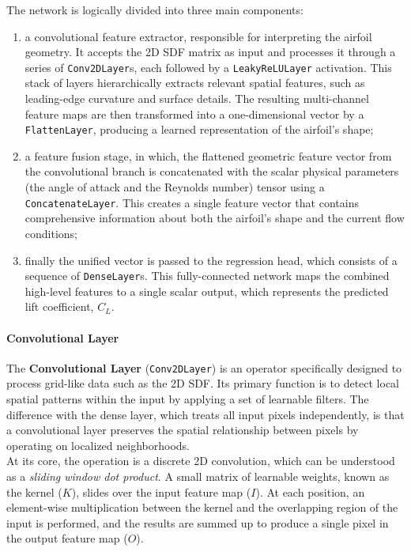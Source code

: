 The network is logically divided into three main components:\\ 
\begin{enumerate}[itemsep=2ex]
    \item a convolutional feature extractor, responsible for interpreting the airfoil geometry. It accepts the 2D SDF matrix as input and processes it through a series of \texttt{Conv2DLayer}s, each followed by a \texttt{LeakyReLULayer} activation. This stack of layers hierarchically extracts relevant spatial features, such as leading-edge curvature and surface details. The resulting multi-channel feature maps are then transformed into a one-dimensional vector by a \texttt{FlattenLayer}, producing a learned representation of the airfoil's shape;
    \item a feature fusion stage, in which, the flattened geometric feature vector from the convolutional branch is concatenated with the scalar physical parameters (the angle of attack and the Reynolds number) tensor using a \texttt{ConcatenateLayer}. This creates a single feature vector that contains comprehensive information about both the airfoil's shape and the current flow conditions;
    \item finally the unified vector is passed to the regression head, which consists of a sequence of \texttt{DenseLayer}s. This fully-connected network maps the combined high-level features to a single scalar output, which represents the predicted lift coefficient, $C_L$.
\end{enumerate}

\paragraph{Convolutional Layer}

The \textbf{Convolutional Layer} (\texttt{Conv2DLayer}) is an operator specifically designed to process grid-like data such as the 2D SDF. Its primary function is to detect local spatial patterns within the input by applying a set of learnable filters. The difference with the dense layer, which treats all input pixels independently, is that a convolutional layer preserves the spatial relationship between pixels by operating on localized neighborhoods.\\

At its core, the operation is a discrete 2D convolution, which can be understood as a \textit{sliding window dot product}. A small matrix of learnable weights, known as the kernel ($K$), slides over the input feature map ($I$). At each position, an element-wise multiplication between the kernel and the overlapping region of the input is performed, and the results are summed up to produce a single pixel in the output feature map ($O$).\\

